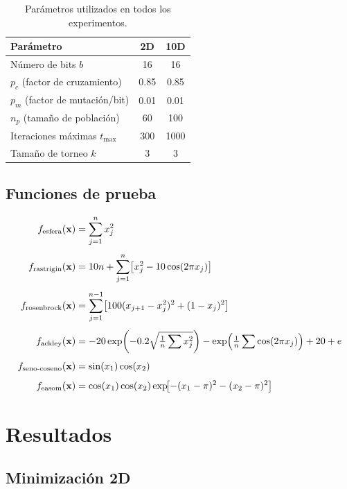\documentclass[11pt]{article}
\begin{document}
\begin{table}[H]
\centering
\begin{tabular}{lcc}
\hline\hline
Par\'ametro & 2D & 10D \\
\hline
N\'umero de bits $b$              & 16   & 16   \\
$p_c$ (factor de cruzamiento)    & 0.85 & 0.85 \\
$p_m$ (factor de mutaci\'on/bit) & 0.01 & 0.01 \\
$n_p$ (tama\~no de poblaci\'on)  & 60   & 100  \\
Iteraciones m\'aximas $t_{\max}$ & 300  & 1000 \\
Tama\~no de torneo $k$           & 3    & 3    \\
\hline\hline
\end{tabular}
\caption{Par\'ametros utilizados en todos los experimentos.}
\end{table}

\subsection{Funciones de prueba}

\begin{align}
f_{\text{esfera}}(\mathbf{x}) &= \sum_{j=1}^{n} x_j^2 \notag\\[4pt]
f_{\text{rastrigin}}(\mathbf{x}) &= 10n + \sum_{j=1}^{n}\bigl[x_j^2 - 10\cos(2\pi x_j)\bigr] \notag\\[4pt]
f_{\text{rosenbrock}}(\mathbf{x}) &= \sum_{j=1}^{n-1}\bigl[100(x_{j+1}-x_j^2)^2 + (1-x_j)^2\bigr] \notag\\[4pt]
f_{\text{ackley}}(\mathbf{x}) &= -20\exp\!\left(-0.2\sqrt{\tfrac{1}{n}\sum x_j^2}\right) - \exp\!\left(\tfrac{1}{n}\sum\cos(2\pi x_j)\right) + 20 + e \notag\\[4pt]
f_{\text{seno-coseno}}(\mathbf{x}) &= \sin(x_1)\cos(x_2) \notag\\[4pt]
f_{\text{easom}}(\mathbf{x}) &= \cos(x_1)\cos(x_2)\exp\!\bigl[-(x_1-\pi)^2-(x_2-\pi)^2\bigr] \notag
\end{align}

\section{Resultados}

\subsection{Minimizaci\'on 2D}
\end{document}
